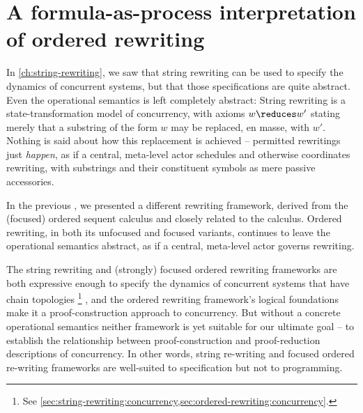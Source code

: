 \chapter{A formula-as-process interpretation of ordered rewriting}\label{ch:formula-as-process}\label{ch:choreographies}



In \cref{ch:string-rewriting}, we saw that string rewriting can be used to specify the dynamics of concurrent systems, but that those specifications are quite abstract.
Even the operational semantics is left completely abstract:
String rewriting is a state-transformation model of concurrency, with axioms $w \reduces w'$
stating merely that a substring of the form $w$ may be replaced, en masse, with $w'$.
Nothing is said about how this replacement is achieved -- permitted rewritings just \emph{happen}, as if a central, meta-level actor schedules and otherwise coordinates rewriting, with substrings and their constituent symbols as mere passive accessories.

In the previous , we presented a different rewriting framework, derived from the (focused) ordered sequent calculus and closely related to the \citeauthor{Lambek:AMM58} calculus\autocite{Lambek:AMM58}.
Ordered rewriting, in both its unfocused and focused variants, continues to leave the operational semantics abstract, as if a central, meta-level actor governs rewriting.

The string rewriting and (strongly) focused ordered rewriting frameworks are both expressive enough to specify the dynamics of concurrent systems that have chain topologies%
\footnote{See \cref{sec:string-rewriting:concurrency,sec:ordered-rewriting:concurrency}.}%
, and the ordered rewriting framework's logical foundations make it a proof-construction approach to concurrency.
But without a concrete operational semantics neither framework is yet suitable for our ultimate goal -- 
to establish the relationship between proof-construction and proof-reduction descriptions of concurrency.
In other words, string re-writing and focused ordered re-writing frameworks are well-suited to specification but not to programming.

